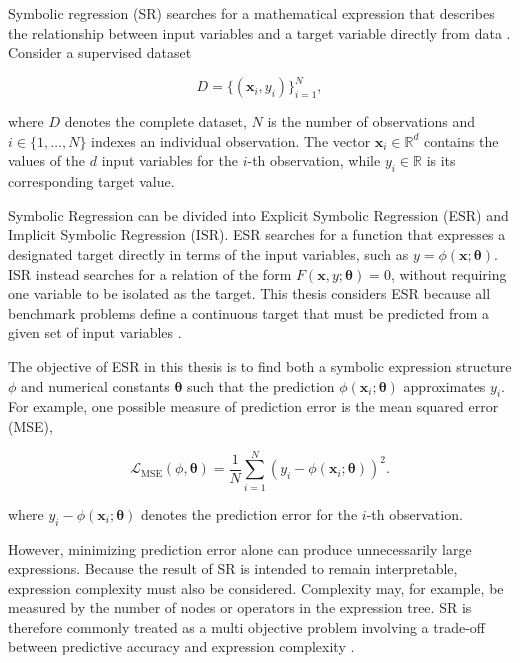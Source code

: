 \documentclass[12pt,oneside,bibtotoc,liststotoc]{scrbook}
\begin{document}
Symbolic regression (SR) searches for a mathematical expression that describes the relationship between input variables and a target variable directly from data \cite{makke2024interpretable}. Consider a supervised dataset

\begin{equation}
    D = \{(\mathbf{x}_i, y_i)\}_{i=1}^{N},
\end{equation}

where $D$ denotes the complete dataset, $N$ is the number of observations and $i \in \{1,\ldots,N\}$ indexes an individual observation. The vector $\mathbf{x}_i \in \mathbb{R}^{d}$ contains the values of the $d$ input variables for the $i$-th observation, while $y_i \in \mathbb{R}$ is its corresponding target value.

Symbolic Regression can be divided into Explicit Symbolic Regression (ESR) and Implicit Symbolic Regression (ISR). ESR searches for a function that expresses a designated target directly in terms of the input variables, such as $y=\phi(\mathbf{x};\boldsymbol{\theta})$. ISR instead searches for a relation of the form $F(\mathbf{x},y;\boldsymbol{\theta})=0$, without requiring one variable to be isolated as the target. This thesis considers ESR because all benchmark problems define a continuous target that must be predicted from a given set of input variables \cite{dong2025recent}.

The objective of ESR in this thesis is to find both a symbolic expression structure $\phi$ and numerical constants $\boldsymbol{\theta}$ such that the prediction $\phi(\mathbf{x}_i;\boldsymbol{\theta})$ approximates $y_i$. For example, one possible measure of prediction error is the mean squared error (MSE),

\begin{equation}
    \mathcal{L}_{\mathrm{MSE}}(\phi,\boldsymbol{\theta})
    =
    \frac{1}{N}
    \sum_{i=1}^{N}
    \left(
        y_i - \phi(\mathbf{x}_i;\boldsymbol{\theta})
    \right)^2.
\end{equation}

where $y_i - \phi(\mathbf{x}_i;\boldsymbol{\theta})$ denotes the prediction error for the $i$-th observation.

However, minimizing prediction error alone can produce unnecessarily large expressions. Because the result of SR is intended to remain interpretable, expression complexity must also be considered. Complexity may, for example, be measured by the number of nodes or operators in the expression tree. SR is therefore commonly treated as a multi objective problem involving a trade-off between predictive accuracy and expression complexity \cite{cranmer2023interpretable,lacava2021contemporary}.
\end{document}
